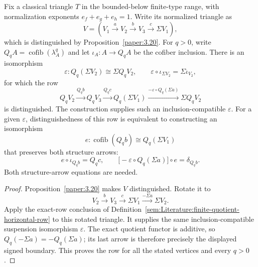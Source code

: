 \begin{theorem}
\label{sem:Literature:normalized-finite-quotient-row}
Fix a classical triangle $T$ in the bounded-below finite-type range,
with normalization exponents $e_f+e_g+e_h=1$. Write its normalized
triangle as
\[
 V=(V_1\xrightarrow aV_2\xrightarrow bV_3\xrightarrow c\Sigma V_1),
\]
which is distinguished by Proposition~\ref{paper:3.20}. For $q>0$, write
$Q_qA=\operatorname{cofib}(\lambda_A^q)$ and let $\iota_A:A\to Q_qA$
be the cofiber inclusion. There is an isomorphism
\[
\varepsilon:Q_q(\Sigma V_2)\cong\Sigma Q_qV_2,
\qquad
\varepsilon\circ\iota_{\Sigma V_2}=\Sigma\iota_{V_2},
\]
for which the row
\[
Q_qV_2\xrightarrow{Q_qb}Q_qV_3
\xrightarrow{Q_qc}Q_q(\Sigma V_1)
\xrightarrow{-\varepsilon\circ Q_q(\Sigma a)}
\Sigma Q_qV_2
\]
is distinguished. The construction supplies such an inclusion-compatible $\varepsilon$.
For a given $\varepsilon$, distinguishedness of this row is
equivalent to constructing an isomorphism
\[
e:\operatorname{cofib}(Q_qb)\cong Q_q(\Sigma V_1)
\]
that preserves both structure arrows:
\[
e\circ\iota_{Q_qb}=Q_qc,\qquad
\bigl[-\varepsilon\circ Q_q(\Sigma a)\bigr]\circ e=\delta_{Q_qb}.
\]
Both structure-arrow equations are needed.

\end{theorem}
\begin{proof}
Proposition~\ref{paper:3.20} makes $V$ distinguished. Rotate it to
\[
 V_2\xrightarrow bV_3\xrightarrow c\Sigma V_1
 \xrightarrow{-\Sigma a}\Sigma V_2.
\]
Apply the exact-row conclusion of
Definition~\ref{sem:Literature:finite-quotient-horizontal-row}
to this rotated triangle. It supplies the same inclusion-compatible
suspension isomorphism $\varepsilon$. The exact quotient functor is
additive, so $Q_q(-\Sigma a)=-Q_q(\Sigma a)$; its last arrow is
therefore precisely the displayed signed boundary. This proves the row for all the stated
vertices and every $q>0$.
\end{proof}

